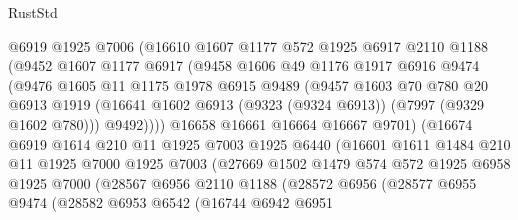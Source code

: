 \begin{lexlean}{RustStd}
\begin{coremodule}
{\begin{coremodule}
{{{{{{{{{{{{{{{{{{{{{{{{{{{{{{{{{{{{{{{{{{{                  @6919
                  @1925
                  @7006
                  (@16610
                    @1607
                    @1177
                    @572
                    @1925
                    @6917
                    @2110
                    @1188
                    (@9452
                      @1607
                      @1177
                      @6917
                      (@9458
                        @1606
                        @49
                        @1176
                        @1917
                        @6916
                        @9474
                        (@9476
                          @1605
                          @11
                          @1175
                          @1978
                          @6915
                          @9489
                          (@9457
                            @1603
                            @70
                            @780
                            @20
                            @6913
                            @1919
                            (@16641 @1602 @6913 (@9323 (@9324 @6913)) (@7997 (@9329 @1602 @780)))
                            @9492))))
                    @16658
                    @16661
                    @16664
                    @16667
                    @9701)
                  (@16674
                    @6919
                    @1614
                    @210
                    @11
                    @1925
                    @7003
                    @1925
                    @6440
                    (@16601
                      @1611
                      @1484
                      @210
                      @11
                      @1925
                      @7000
                      @1925
                      @7003
                      (@27669
                        @1502
                        @1479
                        @574
                        @572
                        @1925
                        @6958
                        @1925
                        @7000
                        (@28567
                          @6956
                          @2110
                          @1188
                          (@28572
                            @6956
                            (@28577
                              @6955
                              @9474
                              (@28582
                                @6953
                                @6542
                                (@16744
                                  @6942
                                  @6951
}}}}}}}}}}}}}}}}}}}}}}}}}}}}}}}}}}}}}}}}}}}
\end{coremodule}}
\end{coremodule}
\end{lexlean}
